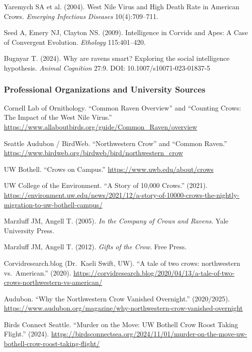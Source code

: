 \documentclass[11pt,letterpaper]{article}
\newcommand{\stageheader}[2]{%
  \noindent\colorbox{#2}{\makebox[\textwidth][l]{%
    \textcolor{white}{\bfseries\sffamily\hspace{6pt}#1\hspace{6pt}}}}%
  \vspace{0.5em}\par%
}
\begin{document}
Yaremych SA et al. (2004). West Nile Virus and High Death Rate in American Crows. \textit{Emerging Infectious Diseases} 10(4):709--711.

Seed A, Emery NJ, Clayton NS. (2009). Intelligence in Corvids and Apes: A Case of Convergent Evolution. \textit{Ethology} 115:401--420.

Bugnyar T. (2024). Why are ravens smart? Exploring the social intelligence hypothesis. \textit{Animal Cognition} 27:9. DOI: 10.1007/s10071-023-01837-5

\subsubsection{Professional Organizations and University Sources}

Cornell Lab of Ornithology. ``Common Raven Overview'' and ``Counting Crows: The Impact of the West Nile Virus.''
\url{https://www.allaboutbirds.org/guide/Common_Raven/overview}

Seattle Audubon / BirdWeb. ``Northwestern Crow'' and ``Common Raven.''
\url{https://www.birdweb.org/birdweb/bird/northwestern_crow}

UW Bothell. ``Crows on Campus.''
\url{https://www.uwb.edu/about/crows}

UW College of the Environment. ``A Story of 10,000 Crows.'' (2021).
\url{https://environment.uw.edu/news/2021/12/a-story-of-10000-crows-the-nightly-migration-to-uw-bothell-campus/}

Marzluff JM, Angell T. (2005). \textit{In the Company of Crows and Ravens}. Yale University Press.

Marzluff JM, Angell T. (2012). \textit{Gifts of the Crow}. Free Press.

Corvidresearch.blog (Dr.\ Kaeli Swift, UW). ``A tale of two crows: northwestern vs.\ American.'' (2020).
\url{https://corvidresearch.blog/2020/04/13/a-tale-of-two-crows-northwestern-vs-american/}

Audubon. ``Why the Northwestern Crow Vanished Overnight.'' (2020/2025).
\url{https://www.audubon.org/magazine/why-northwestern-crow-vanished-overnight}

Birds Connect Seattle. ``Murder on the Move: UW Bothell Crow Roost Taking Flight.'' (2024).
\url{https://birdsconnectsea.org/2024/11/01/murder-on-the-move-uw-bothell-crow-roost-taking-flight/}

\newpage

\stageheader{STAGE 3 --- MISSION PACKAGE}{tertiary}
\end{document}
